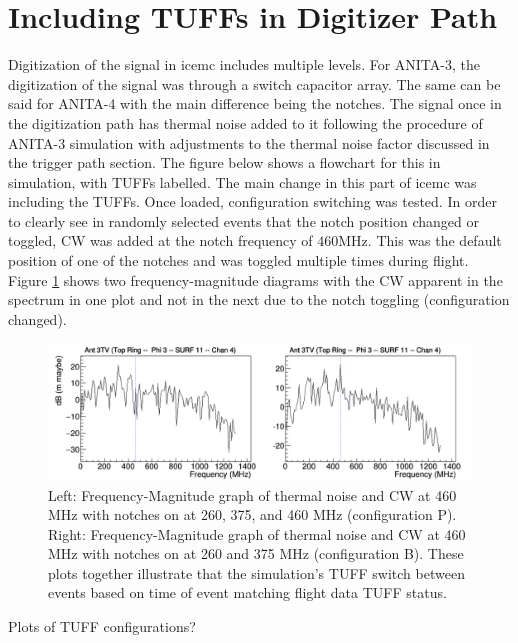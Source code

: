 \documentclass[12pt]{article}
\theoremstyle{plain}
\theoremstyle{definition}
\begin{document}
\section{Including TUFFs in Digitizer Path}
\hspace{0.2in} 
Digitization of the signal in icemc includes multiple levels. For ANITA-3, the digitization of the signal was through a switch capacitor array. The same can be said for ANITA-4 with the main difference being the notches. 
The signal once in the digitization path has thermal noise added to it following the procedure of ANITA-3 simulation with adjustments to the thermal noise factor discussed in the trigger path section. The figure below shows a flowchart for this in simulation, with TUFFs labelled. 
The main change in this part of icemc was including the TUFFs. Once loaded, configuration switching was tested. In order to clearly see in randomly selected events that the notch position changed or toggled, CW was added at the notch frequency of $460$MHz. This was the default position of one of the notches and was toggled multiple times during flight. Figure \ref{fig:cw} shows two frequency-magnitude diagrams with the CW apparent in the spectrum in one plot and not in the next due to the notch toggling (configuration changed).

\begin{figure}
    \centering
	\includegraphics[scale=0.35]{"CW_notches_illustration/notch_on_notch_off_cw_460"}
	\caption{Left: Frequency-Magnitude graph of thermal noise and CW at 460 MHz with notches on at 260, 375, and 460 MHz (configuration P). Right: Frequency-Magnitude graph of thermal noise and CW at 460 MHz with notches on at 260 and 375 MHz (configuration B). These plots together illustrate that the simulation's TUFF switch between events based on time of event matching flight data TUFF status.}
    \label{fig:cw}
\end{figure}

Plots of TUFF configurations?
\end{document}
